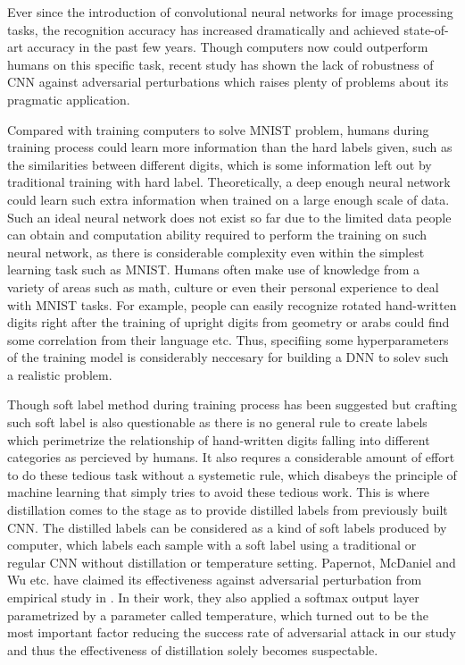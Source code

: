 \documentclass{article}
\begin{document}
Ever since the introduction of convolutional neural networks for image processing tasks, the recognition accuracy has increased dramatically and achieved state-of-art accuracy in the past few years. Though computers now could outperform humans on this specific task,
recent study has shown the lack of robustness of CNN against adversarial perturbations which raises plenty of problems about its pragmatic application. 

Compared with training computers to solve MNIST problem, humans during training process could learn more information than the hard labels given, such as the similarities between different digits, 
which is some information left out by traditional training with hard label. 
Theoretically, a deep enough neural network could learn such extra information when trained on a large enough scale of data. Such an ideal neural network does not exist so far due to the limited data people can obtain and computation ability required to perform the training on such neural network, as there is considerable complexity even within the simplest learning task such as MNIST\cite{schmid}. Humans often make use of knowledge from a variety of areas such as math, culture or even their personal experience to deal with MNIST tasks. For example, people can easily recognize rotated hand-written digits right after the training of upright digits from geometry or arabs could find some correlation from their language etc.
Thus, specifiing some hyperparameters of the training model is considerably neccesary for building a DNN to solev such a realistic problem.

Though soft label method during training process has been suggested but crafting such soft label is also questionable as there is no general rule to create labels which perimetrize the relationship of hand-written digits falling into different categories as percieved by humans.
It also requres a considerable amount of effort to do these tedious task without a systemetic rule, which disabeys the principle of machine learning that simply tries to avoid these tedious work.
This is where distillation comes to the stage as to provide distilled labels from previously built CNN. The distilled labels can be considered as a kind of soft labels produced by computer, which labels each sample with a soft label using a traditional or regular CNN without distillation or temperature setting. 
Papernot, McDaniel and Wu etc. have claimed its effectiveness against adversarial perturbation from empirical study in \cite{Papernot}.
In their work, they also applied a softmax output layer parametrized by a parameter called temperature, which turned out to be the most important factor reducing the success rate of adversarial attack in our study and thus the effectiveness of distillation solely becomes suspectable.
\end{document}
